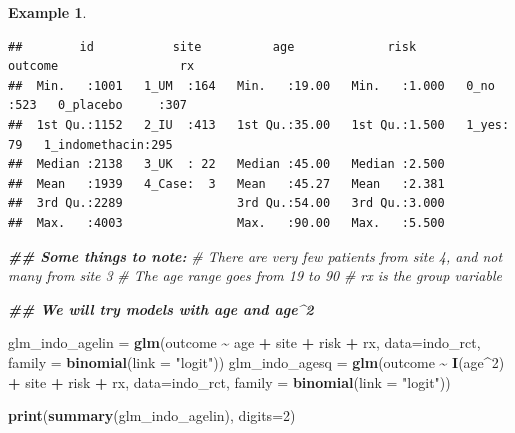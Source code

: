 \documentclass[
  openany]{book}
\newenvironment{Shaded}{\begin{snugshade}}{\end{snugshade}}
\newcommand{\AttributeTok}[1]{\textcolor[rgb]{0.13,0.29,0.53}{#1}}
\newcommand{\CommentTok}[1]{\textcolor[rgb]{0.56,0.35,0.01}{\textit{#1}}}
\newcommand{\DecValTok}[1]{\textcolor[rgb]{0.00,0.00,0.81}{#1}}
\newcommand{\DocumentationTok}[1]{\textcolor[rgb]{0.56,0.35,0.01}{\textbf{\textit{#1}}}}
\newcommand{\FunctionTok}[1]{\textcolor[rgb]{0.13,0.29,0.53}{\textbf{#1}}}
\newcommand{\NormalTok}[1]{#1}
\newcommand{\OtherTok}[1]{\textcolor[rgb]{0.56,0.35,0.01}{#1}}
\newcommand{\SpecialCharTok}[1]{\textcolor[rgb]{0.81,0.36,0.00}{\textbf{#1}}}
\newcommand{\StringTok}[1]{\textcolor[rgb]{0.31,0.60,0.02}{#1}}
\theoremstyle{definition}
\theoremstyle{definition}
\newtheorem{example}{Example}[chapter]
\theoremstyle{definition}
\theoremstyle{definition}
\theoremstyle{remark}
\begin{document}
\begin{example}
\begin{verbatim}
##        id           site          age             risk        outcome                 rx     
##  Min.   :1001   1_UM  :164   Min.   :19.00   Min.   :1.000   0_no :523   0_placebo     :307  
##  1st Qu.:1152   2_IU  :413   1st Qu.:35.00   1st Qu.:1.500   1_yes: 79   1_indomethacin:295  
##  Median :2138   3_UK  : 22   Median :45.00   Median :2.500                                   
##  Mean   :1939   4_Case:  3   Mean   :45.27   Mean   :2.381                                   
##  3rd Qu.:2289                3rd Qu.:54.00   3rd Qu.:3.000                                   
##  Max.   :4003                Max.   :90.00   Max.   :5.500
\end{verbatim}

\begin{Shaded}
\begin{Highlighting}[]
\DocumentationTok{\#\# Some things to note:}
\CommentTok{\# There are very few patients from site 4, and not many from site 3}
\CommentTok{\# The age range goes from 19 to 90 }
\CommentTok{\# \textquotesingle{}rx\textquotesingle{} is the group variable}

\DocumentationTok{\#\# We will try models with age and age\^{}2}

\NormalTok{glm\_indo\_agelin }\OtherTok{=} \FunctionTok{glm}\NormalTok{(outcome }\SpecialCharTok{\textasciitilde{}}\NormalTok{ age }\SpecialCharTok{+}\NormalTok{ site }\SpecialCharTok{+}\NormalTok{ risk }\SpecialCharTok{+}\NormalTok{ rx, }\AttributeTok{data=}\NormalTok{indo\_rct, }
                      \AttributeTok{family =} \FunctionTok{binomial}\NormalTok{(}\AttributeTok{link =} \StringTok{"logit"}\NormalTok{))}
\NormalTok{glm\_indo\_agesq }\OtherTok{=} \FunctionTok{glm}\NormalTok{(outcome }\SpecialCharTok{\textasciitilde{}} \FunctionTok{I}\NormalTok{(age}\SpecialCharTok{\^{}}\DecValTok{2}\NormalTok{) }\SpecialCharTok{+}\NormalTok{ site }\SpecialCharTok{+}\NormalTok{ risk }\SpecialCharTok{+}\NormalTok{ rx, }\AttributeTok{data=}\NormalTok{indo\_rct, }
                     \AttributeTok{family =} \FunctionTok{binomial}\NormalTok{(}\AttributeTok{link =} \StringTok{"logit"}\NormalTok{))}

\FunctionTok{print}\NormalTok{(}\FunctionTok{summary}\NormalTok{(glm\_indo\_agelin), }\AttributeTok{digits=}\DecValTok{2}\NormalTok{)}
\end{Highlighting}
\end{Shaded}


\end{example}
\end{document}
